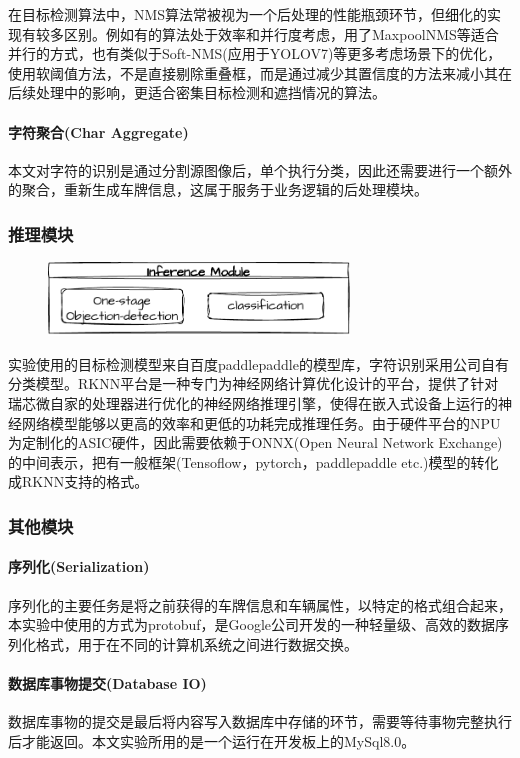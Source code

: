 \documentclass[master]{shtthesis}
\begin{document}
在目标检测算法中，NMS算法常被视为一个后处理的性能瓶颈环节，但细化的实现有较多区别。例如有的算法处于效率和并行度考虑，用了MaxpoolNMS等适合并行的方式，也有类似于Soft-NMS(应用于YOLOV7)等更多考虑场景下的优化，使用软阈值方法，不是直接剔除重叠框，而是通过减少其置信度的方法来减小其在后续处理中的影响，更适合密集目标检测和遮挡情况的算法。

\paragraph{字符聚合(Char Aggregate)}
本文对字符的识别是通过分割源图像后，单个执行分类，因此还需要进行一个额外的聚合，重新生成车牌信息，这属于服务于业务逻辑的后处理模块。



\subsubsection{推理模块}
\begin{figure}[H]
	\centering
	\includegraphics[width=8cm]{img/m3.pdf}
	\label{推理模块汇总}
\end{figure}
实验使用的目标检测模型来自百度paddlepaddle的模型库，字符识别采用公司自有分类模型。RKNN平台是一种专门为神经网络计算优化设计的平台，提供了针对瑞芯微自家的处理器进行优化的神经网络推理引擎，使得在嵌入式设备上运行的神经网络模型能够以更高的效率和更低的功耗完成推理任务。由于硬件平台的NPU为定制化的ASIC硬件，因此需要依赖于ONNX(Open Neural Network Exchange)的中间表示，把有一般框架(Tensoflow，pytorch，paddlepaddle etc.)模型的转化成RKNN支持的格式。

\subsubsection{其他模块}
\paragraph{序列化(Serialization)}
序列化的主要任务是将之前获得的车牌信息和车辆属性，以特定的格式组合起来，本实验中使用的方式为protobuf，是Google公司开发的一种轻量级、高效的数据序列化格式，用于在不同的计算机系统之间进行数据交换。

\paragraph{数据库事物提交(Database IO)}
数据库事物的提交是最后将内容写入数据库中存储的环节，需要等待事物完整执行后才能返回。本文实验所用的是一个运行在开发板上的MySql8.0。
\end{document}
